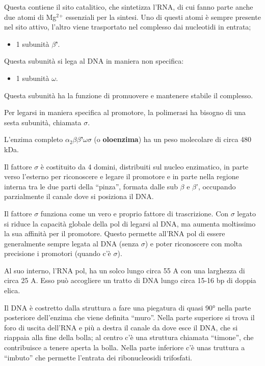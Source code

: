 \documentclass[11pt]{book}
\begin{document}
Questa contiene il sito catalitico, che sintetizza l'RNA, di cui fanno
parte anche due atomi di Mg\(^2\)\(^+\) essenziali per la sintesi. Uno
di questi atomi è sempre presente nel sito attivo, l'altro viene
trasportato nel complesso dai nucleotidi in entrata;

\begin{itemize}
\itemsep1pt\parskip0pt
\item
  1 subunità \textbf{\(\beta\)'}.
\end{itemize}

Questa subunità si lega al DNA in maniera non specifica:

\begin{itemize}
\itemsep1pt\parskip0pt
\item
  1 subunità \textbf{\(\omega\)}.
\end{itemize}

Questa subunità ha la funzione di promuovere e mantenere stabile il
complesso.

Per legarsi in maniera specifica al promotore, la polimerasi ha bisogno
di una sesta subunità, chiamata \textbf{\(\sigma\)}.

L'enzima completo
\textbf{\(\alpha\)\(_2\)\(\beta\)\(\beta\)'\(\omega\)\(\sigma\)} (o
\textbf{oloenzima}) ha un peso molecolare di circa 480 kDa.

Il fattore \(\sigma\) è costituito da 4 domini, distribuiti sul nucleo
enzimatico, in parte verso l'esterno per riconoscere e legare il
promotore e in parte nella regione interna tra le due parti della
``pinza'', formata dalle sub \(\beta\) e \(\beta\)', occupando
parzialmente il canale dove si posiziona il DNA.

Il fattore \(\sigma\) funziona come un vero e proprio fattore di
trascrizione. Con \(\sigma\) legato si riduce la capacità globale della
pol di legarsi al DNA, ma aumenta moltissimo la sua affinità per il
promotore. Questo permette all'RNA pol di essere generalmente sempre
legata al DNA (senza \(\sigma\)) e poter riconoscere con molta
precisione i promotori (quando c'è \(\sigma\)).

Al suo interno, l'RNA pol, ha un solco lungo circa 55 A con una
larghezza di circa 25 A. Esso può accogliere un tratto di DNA lungo
circa 15-16 bp di doppia elica.

Il DNA è costretto dalla struttura a fare una piegatura di quasi 90°
nella parte posteriore dell'enzima che viene definita ``muro''. Nella
parte superiore si trova il foro di uscita dell'RNA e più a destra il
canale da dove esce il DNA, che si riappaia alla fine della bolla; al
centro c'è una struttura chiamata ``timone'', che contribuisce a tenere
aperta la bolla. Nella parte inferiore c'è unas truttura a ``imbuto''
che permette l'entrata dei ribonucleosidi trifosfati.
\end{document}
